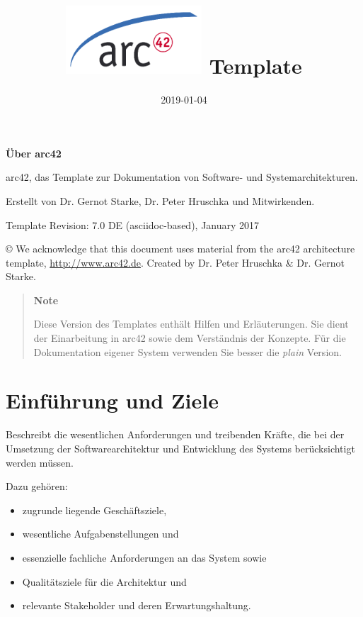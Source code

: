 \documentclass[]{article}
\title{\includegraphics{images/arc42-logo.png} Template}
\date{2019-01-04}
\begin{document}
\maketitle

\section{}

\textbf{Über arc42}

arc42, das Template zur Dokumentation von Software- und
Systemarchitekturen.

Erstellt von Dr. Gernot Starke, Dr. Peter Hruschka und Mitwirkenden.

Template Revision: 7.0 DE (asciidoc-based), January 2017

© We acknowledge that this document uses material from the arc42
architecture template, \url{http://www.arc42.de}. Created by Dr. Peter
Hruschka \& Dr. Gernot Starke.

\begin{quote}
\textbf{Note}

Diese Version des Templates enthält Hilfen und Erläuterungen. Sie dient
der Einarbeitung in arc42 sowie dem Verständnis der Konzepte. Für die
Dokumentation eigener System verwenden Sie besser die \emph{plain}
Version.
\end{quote}

\hypertarget{section-introduction-and-goals}{%
\section{Einführung und Ziele}\label{section-introduction-and-goals}}

Beschreibt die wesentlichen Anforderungen und treibenden Kräfte, die bei
der Umsetzung der Softwarearchitektur und Entwicklung des Systems
berücksichtigt werden müssen.

Dazu gehören:

\begin{itemize}
\item
  zugrunde liegende Geschäftsziele,
\item
  wesentliche Aufgabenstellungen und
\item
  essenzielle fachliche Anforderungen an das System sowie
\item
  Qualitätsziele für die Architektur und
\item
  relevante Stakeholder und deren Erwartungshaltung.
\end{itemize}
\end{document}
